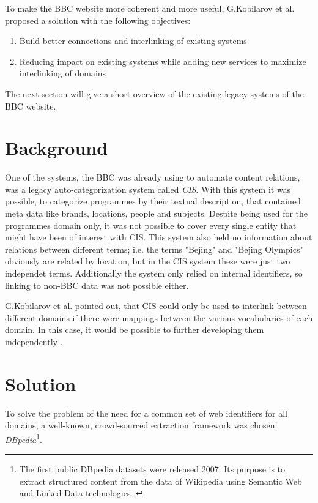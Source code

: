 \documentclass{llncs}
\begin{document}
\vspace{15mm}

To make the BBC website more coherent and more useful, G.Kobilarov et al. proposed a solution \cite{mmsw} with the following objectives:
\begin{enumerate}
  \item Build better connections and interlinking of existing systems
  \item Reducing impact on existing systems while adding new services to maximize interlinking of domains
\end{enumerate}

The next section will give a short overview of the existing legacy systems of the BBC website.

\section{Background}
%
One of the systems, the BBC was already using to automate content relations, was a legacy auto-categorization system called \textit{CIS}. With this system it was possible, to categorize programmes by their textual description, that contained meta data like brands, locations, people and subjects. Despite being used for the programmes domain only, it was not possible to cover every single entity that might have been of interest with CIS. This system also held no information about relations between different terms; i.e. the terms "Bejing" and "Bejing Olympics" obviously are related by location, but in the CIS system these were just two independet terms. Additionally the system only relied on internal identifiers, so linking to non-BBC data was not possible either.

G.Kobilarov et al. pointed out, that CIS could only be used to interlink between different domains if there were mappings between the various vocabularies of each domain. In this case, it would be possible to further developing them independently \cite{mmsw}.

\section{Solution}
%
To solve the problem of the need for a common set of web identifiers for all domains, a well-known, crowd-sourced extraction framework was chosen: \textit{DBpedia}\footnote{The first public DBpedia datasets were released 2007. Its purpose is to extract structured content from the data of Wikipedia using Semantic Web and Linked Data technologies \cite{dbpedia}.}.
\end{document}
